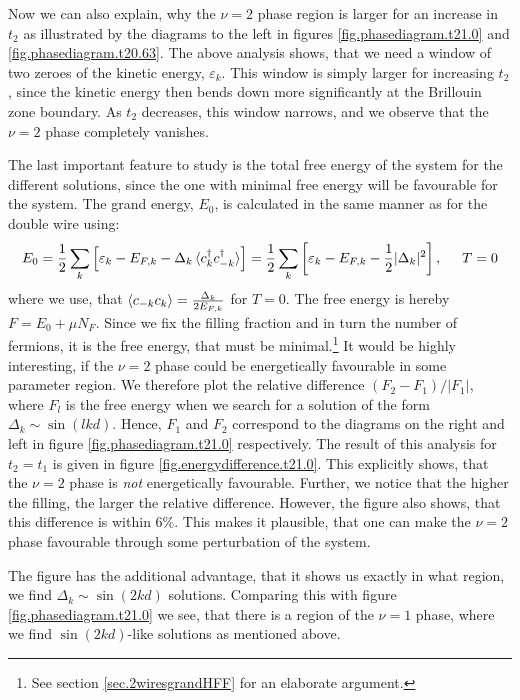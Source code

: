 Now we can also explain, why the $\nu = 2$ phase region is larger for an increase in $t_2$ as illustrated by the diagrams to the left in figures \ref{fig.phasediagram.t21.0} and \ref{fig.phasediagram.t20.63}. The above analysis shows, that we need a window of two zeroes of the kinetic energy, $\varepsilon_k$. This window is simply larger for increasing $t_2$, since the kinetic energy then bends down more significantly at the Brillouin zone boundary. As $t_2$ decreases, this window narrows, and we observe that the $\nu = 2$ phase completely vanishes. 

The last important feature to study is the total free energy of the system for the different solutions, since the one with minimal free energy will be favourable for the system. The grand energy, $E_0$, is calculated in the same manner as for the double wire using:
\begin{equation}
E_0 = \frac{1}{2}\sum_k \left[\varepsilon_k - E_{F,k} - \Delta_k\braket{c^\dagger_{k}c^\dagger_{-k}}\right] = \frac{1}{2}\sum_k \left[\varepsilon_k - E_{F,k} - \frac{1}{2}|\Delta_k|^2\right], \hspace{0.5cm} T = 0
\label{eq.groundstategrandenergy.sumformula}
\end{equation}
where we use, that $\braket{c_{-k}c_k} = \frac{\Delta_k}{2E_{F,k}}$ for $T = 0$. The free energy is hereby $F = E_0 + \mu N_F$. Since we fix the filling fraction and in turn the number of fermions, it is the free energy, that must be minimal.\footnote{See section \ref{sec.2wiresgrandHFF} for an elaborate argument.}  It would be highly interesting, if the $\nu = 2$ phase could be energetically favourable in some parameter region. We therefore plot the relative difference $(F_2 - F_1)/|F_1|$, where $F_l$ is the free energy when we search for a solution of the form $\Delta_k \sim \sin(lkd)$. Hence, $F_1$ and $F_2$ correspond to the diagrams on the right and left in figure \ref{fig.phasediagram.t21.0} respectively. The result of this analysis for $t_2 = t_1$ is given in figure \ref{fig.energydifference.t21.0}. This explicitly shows, that the $\nu = 2$ phase is \textit{not} energetically favourable. Further, we notice that the higher the filling, the larger the relative difference. However, the figure also shows, that this difference is within $6\%$. This makes it plausible, that one can make the $\nu = 2$ phase favourable through some perturbation of the system. 

The figure has the additional advantage, that it shows us exactly in what region, we find $\Delta_k \sim \sin(2kd)$ solutions. Comparing this with figure \ref{fig.phasediagram.t21.0} we see, that there is a region of the $\nu = 1$ phase, where we find $\sin(2kd)$-like solutions as mentioned above. 

